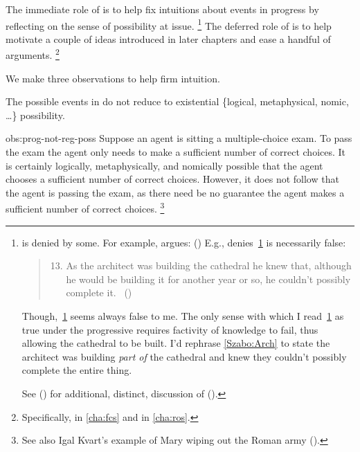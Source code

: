 \begin{note}
  The immediate role of \assuPP{} is to help fix intuitions about events in progress by reflecting on the sense of possibility at issue.%
  \footnote{
     is denied by some.
    For example, \citeauthor{Szabo:2004ul} argues:
    (\citeyear[40]{Szabo:2004ul})
    E.g., \citeauthor{Szabo:2004ul} denies~\ref{Szabo:Arch} is necessarily false:
    \begin{quote}
      \begin{enumerate}[label=(\arabic*), ref=(\arabic*)]
        \setcounter{enumi}{12}
      \item
        \label{Szabo:Arch}
        As the architect was building the cathedral he knew that, although he would be building it for another year or so, he couldn't possibly complete it.%
        \mbox{ }\hfill\mbox{(\citeyear[38]{Szabo:2004ul})}
      \end{enumerate}
    \end{quote}
    Though,~\ref{Szabo:Arch} seems always false to me.
    The only sense with which I read~\ref{Szabo:Arch} as true under the progressive requires factivity of knowledge to fail, thus allowing the cathedral to be built.
    I'd rephrase \autoref{Szabo:Arch} to state the architect was building \emph{part of} the cathedral and knew they couldn't possibly complete the entire thing.

    See (\cite[1245]{Portner:2011vi}) for additional, distinct, discussion of (\cite{Szabo:2004ul}).
  }
  The deferred role of \assuPP{} is to help motivate a couple of ideas introduced in later chapters and ease a handful of arguments.%
  \footnote{
    Specifically,  in \autoref{cha:fcs} and  in \autoref{cha:ros}.
  }

  We make three observations to help firm intuition.

  \begin{observation}%
    \label{obs:prog-not-reg-poss}%
    The possible events in \assuPP{} do not reduce to existential \{logical, metaphysical, nomic, \dots\} possibility.
  \end{observation}
  \begin{motivation}{obs:prog-not-reg-poss}
    Suppose an agent is sitting a multiple-choice exam.
    To pass the exam the agent only needs to make a sufficient number of correct choices.
    It is certainly logically, metaphysically, and nomically possible that the agent chooses a sufficient number of correct choices.
    However, it does not follow that the agent is passing the exam, as there need be no guarantee the agent makes a sufficient number of correct choices.%
    \footnote{
      See also Igal Kvart's example of Mary wiping out the Roman army (\cite[18]{Landman:1992wh}).
    }
  \end{motivation}


\end{note}
